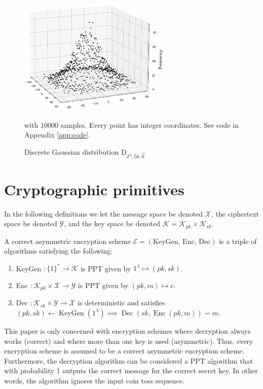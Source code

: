 \begin{figure}
    \centering
    \includegraphics[width=0.65\textwidth]{figures/D-G-2d-a_is_50.pdf}
    \caption{Discrete Gaussian distribution $\textrm{D}_{\mathbb{Z}^2, 50, \vec{0}}$} with $10000$ samples. Every point has integer coordinates. See code in Appendix \ref{app:code}.
    \label{fig:discrete-gauss}
\end{figure}

\chapter{Cryptographic primitives}
In the following definitions we let the message space be denoted $\mathcal{X}$, the ciphertext space be denoted $\mathcal{Y}$, and the key space be denoted $\mathcal{K} = \mathcal{K}_{pk} \times \mathcal{K}_{sk}$.
\begin{definition}
A correct asymmetric encryption scheme $\mathcal{E} = (\text{KeyGen, Enc, Dec})$ is a triple of algorithms satisfying the following:
\begin{enumerate}[label={$\bullet$}]
    \item KeyGen $\colon \{1\}^* \to \mathcal{K}$ is PPT given by $1^{\lambda} \mapsto (pk,sk)$.
    \item Enc $\colon \mathcal{K}_{pk} \times \mathcal{X} \to \mathcal{Y}$ is PPT given by $(pk,m) \mapsto c$.
    \item Dec $\colon \mathcal{K}_{sk} \times \mathcal{Y} \to \mathcal{X}$ is deterministic and satisfies $(pk, sk) \leftarrow \operatorname{KeyGen}(1^{\lambda}) \implies \operatorname{Dec}(sk, \operatorname{Enc}(pk,m)) = m$.
\end{enumerate}
\end{definition}
\begin{remark}
This paper is only concerned with encryption schemes where decryption always works (correct) and where more than one key is used (asymmetric). Thus, every encryption scheme is assumed to be a correct asymmetric encryption scheme. Furthermore, the decryption algorithm can be considered a PPT algorithm that with probability 1 outputs the correct message for the correct secret key. In other words, the algorithm ignores the input coin toss sequence.
\end{remark}

